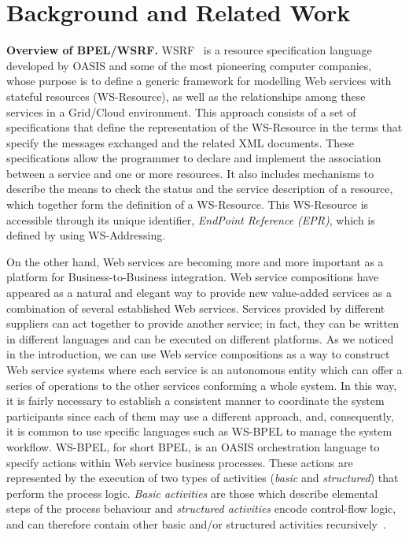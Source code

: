 \section{Background and Related Work}\label{rWork}

{\bf Overview of BPEL/WSRF.} WSRF~\cite{Banks2006} is a resource specification language developed by OASIS and some of the most pioneering computer companies, whose purpose is to define a generic framework for modelling Web services with stateful resources (WS-Resource), as well as the relationships among these services in a Grid/Cloud environment. This approach consists of a set of specifications that define the representation of the WS-Resource in the terms that specify the messages exchanged and the related XML documents. These specifications allow the programmer to declare and implement the association between a service and one or more resources. It also includes mechanisms to describe the means to check the status and the service description of a resource, which together form the definition of a WS-Resource. This WS-Resource is accessible through its unique identifier, 
\emph{EndPoint Reference (EPR)}, which is defined by using WS-Addressing.

On the other hand, Web services are becoming more and more important as a platform
for Business-to-Business integration.  Web service compositions have appeared
as a natural and elegant way to provide new value-added services
as a combination of several established Web services.
Services provided by different suppliers can act together
to provide another service; in fact, they can be written in different
languages and can be executed on different platforms. As we noticed in the introduction, we can use Web service compositions as a way to construct Web service systems where each service is an autonomous entity which can offer a series of operations to the other services conforming a whole system. In this way, it is fairly necessary to establish a consistent manner to coordinate the system participants since each of them may use a different approach, and, consequently, it is common to use specific languages such as WS-BPEL to manage the system workflow. WS-BPEL, for short BPEL, is an OASIS orchestration language to specify actions within Web service business processes. These actions are represented by the execution of two types of activities (\emph{basic} and \emph{structured}) that perform the process logic. \emph{Basic activities} are those which describe elemental steps of the process behaviour and \emph{structured activities} encode control-flow logic, and can therefore contain other basic and/or structured activities recursively~\cite{BPEL4WS}.

